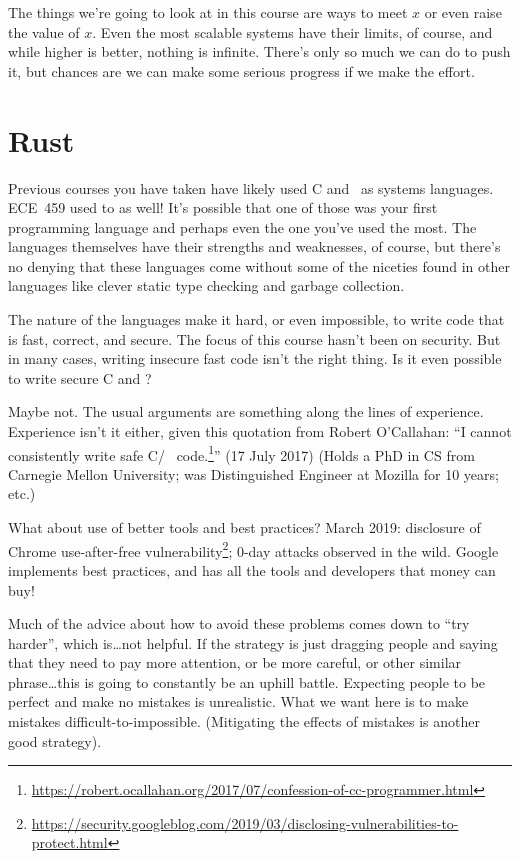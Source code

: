 The things we're going to look at in this course are ways to meet $x$ or even raise the value of $x$. Even the most scalable systems have their limits, of course, and while higher is better, nothing is infinite. There's only so much we can do to push it, but chances are we can make some serious progress if we make the effort.

\section*{Rust}

Previous courses you have taken have likely used C and \CPP~as systems languages. ECE~459 used to as well! It's possible that one of those was your first programming language and perhaps even the one you've used the most. The languages themselves have their strengths and weaknesses, of course, but there's no denying that these languages come without some of the niceties found in other languages like clever static type checking and garbage collection.

The nature of the languages make it hard, or even impossible, to write code that is fast, correct, and secure. The focus of this course hasn't been on security. But in many cases, writing insecure fast code isn't the right thing. Is it even possible to write secure C and \CPP?

Maybe not. The usual arguments are something along the lines of experience. Experience isn't it either, given this quotation from Robert O'Callahan: ``I cannot consistently write safe C/\CPP~ code.\footnote{\url{https://robert.ocallahan.org/2017/07/confession-of-cc-programmer.html}}'' (17 July 2017) (Holds a PhD in CS from Carnegie Mellon University; was Distinguished Engineer at Mozilla for 10 years; etc.)

What about use of better tools and best practices? March 2019: disclosure of Chrome use-after-free vulnerability\footnote{\url{https://security.googleblog.com/2019/03/disclosing-vulnerabilities-to-protect.html}}; 0-day attacks
observed in the wild. Google implements best practices, and has all the tools and developers that
money can buy!

Much of the advice about how to avoid these problems comes down to ``try harder'', which is\ldots not helpful. If the strategy is just dragging people and saying that they need to pay more attention, or be more careful, or other similar phrase\ldots this is going to constantly be an uphill battle. Expecting people to be perfect and make no mistakes is unrealistic. What we want here is to make mistakes difficult-to-impossible. (Mitigating the effects of mistakes is another good strategy).

